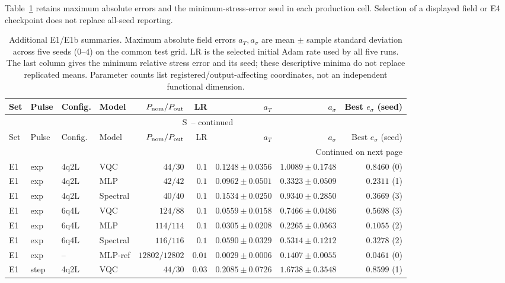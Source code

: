 \documentclass[11pt]{article}
\renewcommand{\thetable}{S\arabic{table}}
\begin{document}
Table~\ref{tab:extra-errors} retains maximum absolute errors and the
minimum-stress-error seed in each production cell. Selection of a displayed
field or E4 checkpoint does not replace all-seed reporting.

\begingroup
\scriptsize
\setlength{\tabcolsep}{2.5pt}
\setlength{\LTcapwidth}{\textwidth}
\begin{longtable}{llllrrrrr}
\caption{Additional E1/E1b summaries. Maximum absolute field errors $a_T,a_\sigma$ are mean $\pm$ sample standard deviation across five seeds ($0$--$4$) on the common test grid. LR is the selected initial Adam rate used by all five runs. The last column gives the minimum relative stress error and its seed; these descriptive minima do not replace replicated means. Parameter counts list registered/output-affecting coordinates, not an independent functional dimension.}\label{tab:extra-errors}\\
\toprule
Set & Pulse & Config. & Model & $P_{\rm nom}/P_{\rm out}$ & LR & $a_T$ & $a_\sigma$ & Best $e_\sigma$ (seed) \\
\midrule
\endfirsthead
\multicolumn{9}{c}{\tablename\ \thetable\ -- continued}\\
\toprule
Set & Pulse & Config. & Model & $P_{\rm nom}/P_{\rm out}$ & LR & $a_T$ & $a_\sigma$ & Best $e_\sigma$ (seed) \\
\midrule
\endhead
\midrule
\multicolumn{9}{r}{Continued on next page}\\
\endfoot
\bottomrule
\endlastfoot
E1 & exp & 4q2L & VQC & $44/30$ & $0.1$ & $0.1248\pm0.0356$ & $1.0089\pm0.1748$ & $0.8460$ (0) \\
E1 & exp & 4q2L & MLP & $42/42$ & $0.1$ & $0.0962\pm0.0501$ & $0.3323\pm0.0509$ & $0.2311$ (1) \\
E1 & exp & 4q2L & Spectral & $40/40$ & $0.1$ & $0.1534\pm0.0250$ & $0.9340\pm0.2850$ & $0.3669$ (3) \\
E1 & exp & 6q4L & VQC & $124/88$ & $0.1$ & $0.0559\pm0.0158$ & $0.7466\pm0.0486$ & $0.5698$ (3) \\
E1 & exp & 6q4L & MLP & $114/114$ & $0.1$ & $0.0305\pm0.0208$ & $0.2265\pm0.0563$ & $0.1055$ (2) \\
E1 & exp & 6q4L & Spectral & $116/116$ & $0.1$ & $0.0590\pm0.0329$ & $0.5314\pm0.1212$ & $0.3278$ (2) \\
E1 & exp & -- & MLP-ref & $12802/12802$ & $0.01$ & $0.0029\pm0.0006$ & $0.1407\pm0.0055$ & $0.0461$ (0) \\
E1 & step & 4q2L & VQC & $44/30$ & $0.03$ & $0.2085\pm0.0726$ & $1.6738\pm0.3548$ & $0.8599$ (1) \\

\end{longtable}
\end{document}
